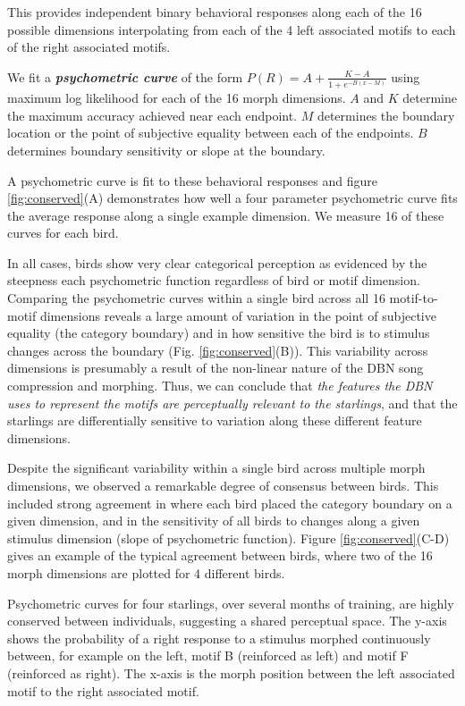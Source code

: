 This provides independent binary behavioral responses along each of the 16 possible dimensions interpolating from each of the 4 left associated motifs to each of the right associated motifs.

We fit a \textit{\textbf{psychometric curve}} of the form $P(R) = A + \frac{K - A}{1 + e^{-B(x-M)}}$ using maximum log likelihood for each of the 16 morph dimensions. $A$ and $K$ determine the maximum accuracy achieved near each endpoint. $M$ determines the boundary location or the point of subjective equality between each of the endpoints. $B$ determines boundary sensitivity or slope at the boundary.

A psychometric curve is fit to these behavioral responses and figure \ref{fig:conserved}(A) demonstrates how well a four parameter psychometric curve fits the average response along a single example dimension. We measure 16 of these curves for each bird.

In all cases, birds show very clear categorical perception as evidenced by the steepness each psychometric function regardless of bird or motif dimension. Comparing the psychometric curves within a single bird across all 16 motif-to-motif dimensions reveals a large amount of variation in the point of subjective equality (the category boundary) and in how sensitive the bird is to stimulus changes across the boundary (Fig. \ref{fig:conserved}(B)). This variability across dimensions is presumably a result of the non-linear nature of the \ac{DBN} song compression and morphing. Thus, we can conclude that \emph{the features the DBN uses to represent the motifs are perceptually relevant to the starlings}, and that the starlings are differentially sensitive to variation along these different feature dimensions.

Despite the significant variability within a single bird across multiple morph dimensions, we observed a remarkable degree of consensus between birds.  This included strong agreement in where each bird placed the category boundary on a given dimension, and in the sensitivity of all birds to changes along a given stimulus dimension (slope of psychometric function). Figure \ref{fig:conserved}(C-D) gives an example of the typical agreement between birds, where two of the 16 morph dimensions are plotted for 4 different birds.

Psychometric curves for four starlings, over several months of training, are highly conserved between individuals, suggesting a shared perceptual space. The y-axis shows the probability of a right response to a stimulus morphed continuously between, for example on the left, motif B (reinforced as left) and motif F (reinforced as right). The x-axis is the morph position between the left associated motif to the right associated motif.

